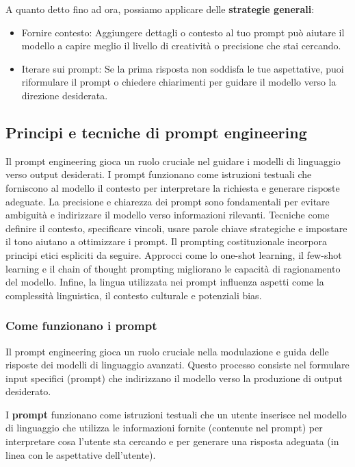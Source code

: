         A quanto detto fino ad ora, possiamo applicare delle \textbf{strategie generali}:
        \begin{itemize}
            \item Fornire contesto: Aggiungere dettagli o contesto al tuo prompt può aiutare il modello a capire meglio il livello di creatività o precisione che stai cercando.

            \item Iterare sui prompt: Se la prima risposta non soddisfa le tue aspettative, puoi riformulare il prompt o chiedere chiarimenti per guidare il modello verso la direzione desiderata.
        \end{itemize}

    \subsection{Principi e tecniche di prompt engineering}
        Il prompt engineering gioca un ruolo cruciale nel guidare i modelli di linguaggio verso output desiderati. I prompt funzionano come istruzioni testuali che forniscono al modello il contesto per interpretare la richiesta e generare risposte adeguate. La precisione e chiarezza dei prompt sono fondamentali per evitare ambiguità e indirizzare il modello verso informazioni rilevanti. Tecniche come definire il contesto, specificare vincoli, usare parole chiave strategiche e impostare il tono aiutano a ottimizzare i prompt. Il prompting costituzionale incorpora principi etici espliciti da seguire. Approcci come lo one-shot learning, il few-shot learning e il chain of thought prompting migliorano le capacità di ragionamento del modello. Infine, la lingua utilizzata nei prompt influenza aspetti come la complessità linguistica, il contesto culturale e potenziali bias.

        \subsubsection{Come funzionano i prompt}
            Il prompt engineering gioca un ruolo cruciale nella modulazione e guida delle risposte dei modelli di linguaggio avanzati. Questo processo consiste nel formulare input specifici (prompt) che indirizzano il modello verso la produzione di output desiderato.

            I \textbf{prompt} funzionano come istruzioni testuali che un utente inserisce nel modello di linguaggio che utilizza le informazioni fornite (contenute nel prompt) per interpretare cosa l'utente sta cercando e per generare una risposta adeguata (in linea con le aspettative dell'utente).
            

